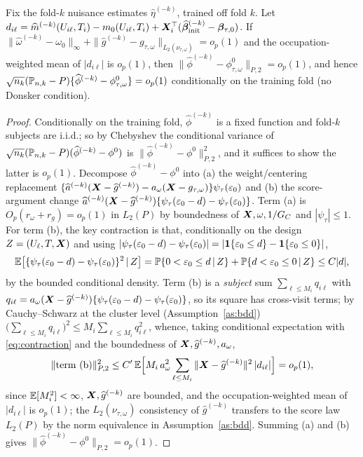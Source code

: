 \begin{lemma}\label{lem:score}
Fix the fold-$k$ nuisance estimates $\widehat\eta^{(-k)}$, trained off fold $k$.
Let $d_{i\ell}=\widehat m^{(-k)}(U_{i\ell},T_i)-m_0(U_{i\ell},T_i)
+\bm{X}_i^\top(\widehat{\bm{\beta}}_{\rm init}^{(-k)}-\bm{\beta}_{\tau,0})$. If
$\|\widehat\omega^{(-k)}-\omega_0\|_\infty+\|\widehat g^{(-k)}-g_{\tau,\omega}\|
_{L_2(\nu_{\tau,\omega})}=o_p(1)$ and the occupation-weighted mean of $|d_{i\ell}|$
is $o_p(1)$, then $\|\widehat\phi^{(-k)}-\phi^0_{\tau,\omega}\|_{P,2}=o_p(1)$,
and hence $\sqrt{n_k}(\mathbb{P}_{n,k}-P)\{\widehat\phi^{(-k)}-\phi^0_{\tau,\omega}\}
=o_p(1)$ conditionally on the training fold (no Donsker condition).
\end{lemma}
\begin{proof}
Conditionally on the training fold, $\widehat\phi^{(-k)}$ is a fixed function and
fold-$k$ subjects are i.i.d.; so by Chebyshev the conditional variance of
$\sqrt{n_k}(\mathbb{P}_{n,k}-P)(\widehat\phi^{(-k)}-\phi^0)$ is
$\|\widehat\phi^{(-k)}-\phi^0\|_{P,2}^2$, and it suffices to show the latter is
$o_p(1)$. Decompose $\widehat\phi^{(-k)}-\phi^0$ into (a) the weight/centering
replacement $\{\widehat a^{(-k)}(\bm{X}-\widehat g^{(-k)})-a_\omega(\bm{X}-g_{\tau,\omega})\}
\psi_\tau(\varepsilon_0)$ and (b) the score-argument change
$\widehat a^{(-k)}(\bm{X}-\widehat g^{(-k)})\{\psi_\tau(\varepsilon_0-d)-\psi_\tau
(\varepsilon_0)\}$. Term (a) is $O_p(r_\omega+r_g)=o_p(1)$ in $L_2(P)$ by
boundedness of $\bm{X},\omega,1/G_C$ and $|\psi_\tau|\le1$. For term (b), the key
contraction is that, conditionally on the design $Z=(U_\ell,T,\bm{X})$ and using
$|\psi_\tau(\varepsilon_0-d)-\psi_\tau(\varepsilon_0)|
=|\mathbf{1}\{\varepsilon_0\le d\}-\mathbf{1}\{\varepsilon_0\le0\}|$,
\begin{equation}
\mathbb{E}\big[\{\psi_\tau(\varepsilon_0-d)-\psi_\tau(\varepsilon_0)\}^2\,\vert\, Z\big]
=\mathbb{P}\{0<\varepsilon_0\le d\,\vert\, Z\}+\mathbb{P}\{d<\varepsilon_0\le0\,\vert\, Z\}
\le C|d|,
\label{eq:contraction}
\end{equation}
by the bounded conditional density. Term (b) is a \emph{subject} sum
$\sum_{\ell\le M_i}q_{i\ell}$ with $q_{i\ell}=a_\omega(\bm{X}-\widehat
g^{(-k)})\{\psi_\tau(\varepsilon_0-d)-\psi_\tau(\varepsilon_0)\}$, so its square
has cross-visit terms; by Cauchy--Schwarz at the cluster level (Assumption~\ref{as:bdd})
$\big(\sum_{\ell\le M_i}q_{i\ell}\big)^2\le M_i\sum_{\ell\le M_i}q_{i\ell}^2$,
whence, taking conditional expectation with \eqref{eq:contraction} and the
boundedness of $\bm{X},\widehat g^{(-k)},a_\omega$,
\[
\|\text{term (b)}\|_{P,2}^2\le C'\,\mathbb{E}\Big[M_i\,a_\omega^2\sum_{\ell\le M_i}
\|\bm{X}-\widehat g^{(-k)}\|^2\,|d_{i\ell}|\Big]=o_p(1),
\]
since $\mathbb{E}[M_i^2]<\infty$, $\bm{X},\widehat g^{(-k)}$ are bounded, and the
occupation-weighted mean of $|d_{i\ell}|$ is $o_p(1)$; the $L_2(\nu_{\tau,\omega})$
consistency of $\widehat g^{(-k)}$ transfers to the score law $L_2(P)$ by the
norm equivalence in Assumption~\ref{as:bdd}. Summing (a) and (b) gives
$\|\widehat\phi^{(-k)}-\phi^0\|_{P,2}=o_p(1)$.
\end{proof}

